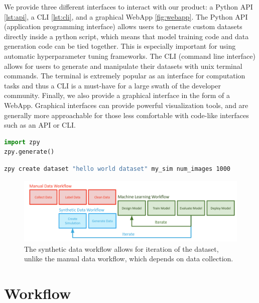 \documentclass{article}
\begin{document}
We provide three different interfaces to interact with our product: a Python API \ref{lst:api}, a CLI \ref{lst:cli}, and a graphical WebApp \ref{fig:webapp}. The Python API (application programming interface) allows users to generate custom datasets directly inside a python script, which means that model training code and data generation code can be tied together. This is especially important for using automatic hyperparameter tuning frameworks. The CLI (command line interface) allows for users to generate and manipulate their datasets with unix terminal commands. The terminal is extremely popular as an interface for computation tasks and thus a CLI is a must-have for a large swath of the developer community. Finally, we also provide a graphical interface in the form of a WebApp. Graphical interfaces can provide powerful visualization tools, and are generally more approachable for those less comfortable with code-like interfaces such as an API or CLI. 

\begin{lstlisting}[language=Python,caption={Generating a dataset using the zpy python API.},label={lst:api}]
import zpy
zpy.generate()
\end{lstlisting}

\begin{lstlisting}[language=bash,caption={Generating a dataset using the zpy CLI},label={lst:cli}]
zpy create dataset "hello world dataset" my_sim num_images 1000
\end{lstlisting}

\begin{figure}
	\centering
	\includegraphics[width=\textwidth]{workflow.png}
	\caption{The synthetic data workflow allows for iteration of the dataset, unlike the manual data workflow, which depends on data collection.}
	\label{fig:workflow}
\end{figure}

\section{Workflow}
\label{sec:workflow}
\end{document}

